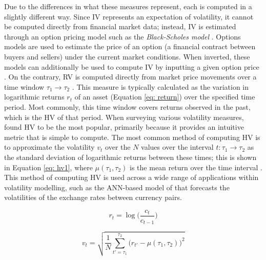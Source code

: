 \documentclass[a4paper, 11pt]{report}
\begin{document}
    Due to the differences in what these measures represent, each is computed in a slightly different way. Since IV represents an expectation of volatility, it cannot be computed directly from financial market data; instead, IV is estimated through an option pricing model such as the \emph{Black-Scholes model} \citep{black-1973}. Options models are used to estimate the price of an option (a financial contract between buyers and sellers) under the current market conditions. When inverted, these models can additionally be used to compute IV by inputting a given option price \citep{tino-2001}. On the contrary, RV is computed directly from market price movements over a time window $\tau_1 \to \tau_2$ \citep{ge-2022}. This measure is typically calculated as the variation in logarithmic returns $r_t$ of an asset (Equation \ref{eq: return}) over the specified time period. Most commonly, this time window covers returns observed in the past, which is the HV of that period. When surveying various volatility measures, \citet{ge-2022} found HV to be the most popular, primarily because it provides an intuitive metric that is simple to compute. The most common method of computing HV is to approximate the volatility $v_t$ over the $N$ values over the interval $t \colon \tau_1 \to \tau_2$ as the standard deviation of logarithmic returns between these times; this is shown in Equation \ref{eq: hv1}, where $\mu(\tau_1, \tau_2)$ is the mean return over the time interval \citep{ge-2022}. This method of computing HV is used across a wide range of applications within volatility modelling, such as the ANN-based model of \citet{lahmiri-2017} that forecasts the volatilities of the exchange rates between currency pairs.

    \begin{equation}
        \label{eq: return}
        r_t = \log\Big(\frac{c_t}{c_{t-1}}\Big)
    \end{equation}

    \begin{equation}
        \label{eq: hv1}
        v_t = \sqrt{ \frac{1}{N} \sum_{t' = \tau_1}^{\tau_2} \big( r_{t'} - \mu(\tau_1, \tau_2) \big)^2 }
    \end{equation}
\end{document}
